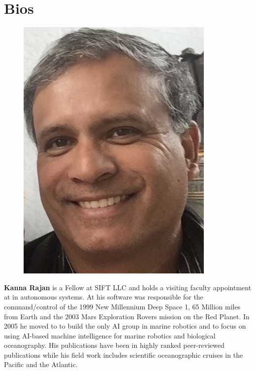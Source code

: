\section{Bios}
\label{sec:bios}

\newpage
\parbox{6.3in}{
\begin{figure} %
    \vspace{-\intextsep}
    \hspace*{-.35\columnsep}\includegraphics[scale=0.4]{fig/KRajan.jpg}
\end{figure}
\textbf{Kanna Rajan} is a Fellow at SIFT LLC and holds a visiting
faculty appointment at \univ in autonomous systems. At \nas his
software was responsible for the command/control of the 1999 New
Millennium Deep Space 1, 65 Million miles from Earth and the 2003 Mars
Exploration Rovers mission on the Red Planet. In 2005 he moved to \mba
to build the only AI group in marine robotics and to focus on using
AI-based machine intelligence for marine robotics and biological
oceanography. His publications have been in highly ranked
peer-reviewed publications while his field work includes scientific
oceanographic cruises in the Pacific and the Atlantic.
\\
}
